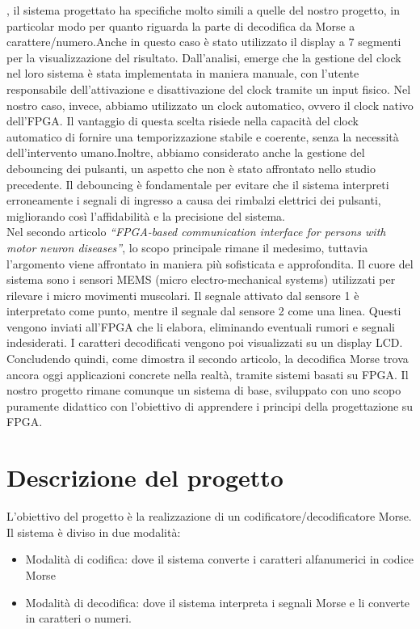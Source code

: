 \documentclass[journal,twoside,web]{ieeecolor}
\begin{document}
\cite{articolo1}, il sistema progettato ha specifiche molto simili a quelle del nostro progetto, in particolar modo per quanto riguarda la parte di decodifica da Morse a carattere/numero.Anche in questo caso è stato utilizzato il display a 7 segmenti per la visualizzazione del risultato. Dall'analisi, emerge che la gestione del clock nel loro sistema è stata implementata in maniera manuale, con l'utente responsabile dell'attivazione e disattivazione del clock tramite un input fisico. Nel nostro caso, invece, abbiamo utilizzato un clock automatico, ovvero il clock nativo dell'FPGA. Il vantaggio di questa scelta risiede nella capacità del clock automatico di fornire una temporizzazione stabile e coerente, senza la necessità dell'intervento umano.Inoltre, abbiamo considerato anche la gestione del debouncing dei pulsanti, un aspetto che non è stato affrontato nello studio precedente. Il debouncing è fondamentale per evitare che il sistema interpreti  erroneamente i segnali di ingresso a causa dei rimbalzi elettrici dei pulsanti, migliorando così l'affidabilità e la precisione del sistema.\\
Nel secondo articolo \textit{“FPGA-based communication interface for persons with motor neuron diseases”}, \cite{articolo2} lo scopo principale rimane il medesimo, tuttavia l’argomento viene affrontato in maniera più sofisticata e approfondita. Il cuore del sistema sono i sensori MEMS (micro electro-mechanical systems) utilizzati per rilevare i micro movimenti muscolari. Il segnale attivato dal sensore 1 è interpretato come punto, mentre il segnale dal sensore 2 come una linea. Questi vengono inviati all’FPGA che li elabora, eliminando eventuali rumori e segnali indesiderati. I caratteri decodificati vengono poi visualizzati su un display LCD.
Concludendo quindi, come dimostra il secondo articolo, la decodifica Morse trova ancora oggi applicazioni concrete nella realtà, tramite sistemi basati su FPGA. Il nostro progetto rimane comunque un sistema di base, sviluppato con uno scopo puramente didattico con l'obiettivo di apprendere i principi della progettazione su FPGA.


\section{Descrizione del progetto}
L’obiettivo del  progetto è la realizzazione di un codificatore/decodificatore Morse. Il sistema è diviso in due modalità:
\begin{itemize}
    \item Modalità di codifica: dove il sistema converte i caratteri alfanumerici in codice Morse
    \item Modalità di decodifica: dove il sistema interpreta i segnali Morse e li converte in caratteri o numeri.
\end{itemize}
\end{document}
